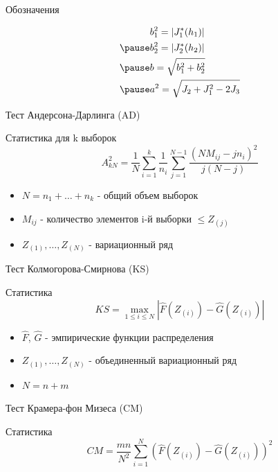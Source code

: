 \documentclass[handout]{beamer}
\begin{document}
\begin{frame}{Обозначения}
	
	\begin{align*}
		&b^2_1 = | J^*_1(h_1) |\\
		\pause
		&b^2_2 = | J^*_2(h_2) |\\
		\pause
		&b = \sqrt{b^2_1 + b^2_2} \\
		\pause
		&a^2 = \sqrt{ J_2 + J^2_1 - 2J_3}
	\end{align*}
	
\end{frame}

\begin{frame}{Тест Андерсона-Дарлинга (AD)}
	    \begin{block}{Статистика для k выборок}
		        \[
		        A_{kN}^2 = \frac{1}{N} \sum_{i=1}^k \frac{1}{n_i} \sum_{j=1}^{N-1} \frac{(NM_{ij} - jn_i)^2}{j(N-j)}
		      \]
		    \end{block}
	    
	    \begin{itemize}
		        \item $N = n_1 + \ldots + n_k$ - общий объем выборок
		        \item $M_{ij}$ - количество элементов i-й выборки $\leq Z_{(j)}$
		        \item $Z_{(1)}, \ldots, Z_{(N)}$ - вариационный ряд
		    \end{itemize}
	    \end{frame}



\begin{frame}{Тест Колмогорова-Смирнова (KS)}
	    \begin{block}{Статистика}
		        \[
		        KS = \max_{1 \leq i \leq N} |\hat{F}(Z_{(i)}) - \hat{G}(Z_{(i)})|
		        \]
		    \end{block}
	    
	    \begin{itemize}
		        \item $\hat{F}$, $\hat{G}$ - эмпирические функции распределения
		        \item $Z_{(1)}, \ldots, Z_{(N)}$ - объединенный вариационный ряд
		        \item $N = n + m$
		    \end{itemize}
	\end{frame}



\begin{frame}{Тест Крамера-фон Мизеса (CM)}
	    \begin{block}{Статистика}
		        \[
		        CM = \frac{mn}{N^2} \sum_{i=1}^N (\hat{F}(Z_{(i)}) - \hat{G}(Z_{(i)}))^2
		        \]
		    \end{block}
	    
	\end{frame}
\end{document}
